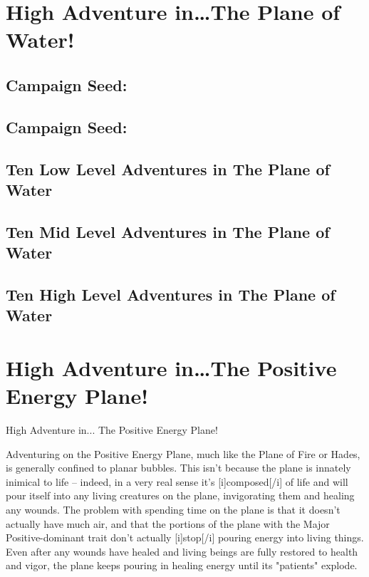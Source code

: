 \section{High Adventure in\dots The Plane of Water!}


\subsection*{Campaign Seed: }

\subsection*{Campaign Seed: }

\subsection*{Ten Low Level Adventures in The Plane of Water}

\subsection*{Ten Mid Level Adventures in The Plane of Water}

\subsection*{Ten High Level Adventures in The Plane of Water}

\section{High Adventure in\dots The Positive Energy Plane!}

High Adventure in... The Positive Energy Plane!

Adventuring on the Positive Energy Plane, much like the Plane of Fire or Hades, is generally confined to planar bubbles. This isn't because the plane is innately inimical to life -- indeed, in a very real sense it's [i]composed[/i] of life and will pour itself into any living creatures on the plane, invigorating them and healing any wounds. The problem with spending time on the plane is that it doesn't actually have much air, and that the portions of the plane with the Major Positive-dominant trait don't actually [i]stop[/i] pouring energy into living things. Even after any wounds have healed and living beings are fully restored to health and vigor, the plane keeps pouring in healing energy until its "patients" explode.

